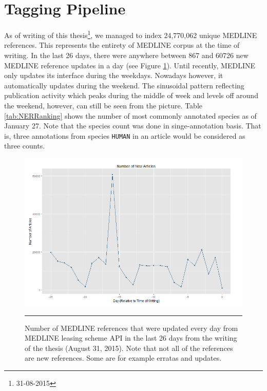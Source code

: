 \section{Tagging Pipeline}

As of writing of this thesis\footnote{31-08-2015}, we managed to index 24,770,062 unique MEDLINE references. This represents the entirety of MEDLINE corpus at the time of writing. In the last 26 days, there were anywhere between 867 and 60726 new MEDLINE reference updates in a day (see Figure \ref{fig:NewArticles}). Until recently, MEDLINE only updates its interface during the weekdays. Nowadays however, it automatically updates during the weekend. The sinusoidal pattern reflecting publication activity which peaks during the middle of week and levels off around the weekend, however, can still be seen from the picture. Table \ref{tab:NERRanking} shows the number of most commonly annotated species as of January 27. Note that the species count was done in singe-annotation basis. That is, three annotations from species \texttt{HUMAN} in an article would be considered as three counts.

\begin{figure}[htbp]
	\centering
    \includegraphics[width=6in]{Figures/NewArticles.png}
    \rule{35em}{0.5pt}
  \caption[Number of incoming MEDLINE updates]{Number of MEDLINE references that were updated every day from MEDLINE leasing scheme API in the last 26 days from the writing of the thesis (August 31, 2015). Note that not all of the references are new references. Some are for example erratas and updates.}
  \label{fig:NewArticles}
\end{figure}



